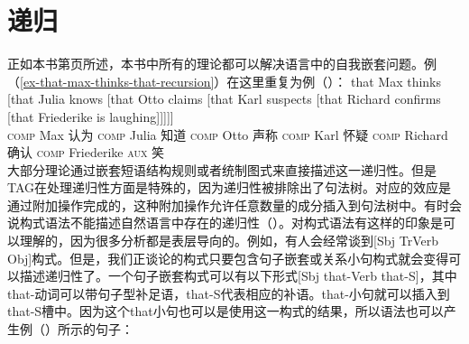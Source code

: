 \section{递归}
\label{sec-recursion}

正如本书第\pageref{ex-that-max-thinks-that-recursion}页所述，本书中所有的理论都可以解决语言中的自我嵌套问题。例（\ref{ex-that-max-thinks-that-recursion}）在这里重复为例（）：
\ea
\label{ex-that-max-thinks-that-recursion-two}
\gll that Max thinks [that Julia knows [that Otto claims [that Karl suspects [that Richard confirms [that Friederike is laughing]]]]]\\
	\textsc{comp} Max 认为 \spacebr\textsc{comp} Julia 知道 \spacebr\textsc{comp} Otto 声称 \spacebr\textsc{comp} Karl 怀疑 \spacebr\textsc{comp} Richard 确认 \spacebr\textsc{comp} Friederike \textsc{aux} 笑\\
\z
大部分理论通过嵌套短语结构规则或者统制图式来直接描述这一递归性。但是TAG\indextagc 在处理递归性方面是特殊的，因为递归性被排除出了句法树。对应的效应是通过附加操作完成的，这种附加操作允许任意数量的成分插入到句法树中。有时会说构式语法\indexcxgc 不能描述自然语言中存在的递归性（\egc \citealp[]{Leiss2009a}）。对构式语法有这样的印象是可以理解的，因为很多分析都是表层导向的。例如，有人会经常谈到[Sbj TrVerb Obj]构式。但是，我们正谈论的构式只要包含句子嵌套或关系小句构式就会变得可以描述递归性了。一个句子嵌套构式可以有以下形式[Sbj that-Verb that-S]，其中that-动词可以带句子型补足语，that-S代表相应的补语。that-小句就可以插入到that-S槽中。因为这个that小句也可以是使用这一构式的结果，所以语法也可以产生例（）所示的句子：
